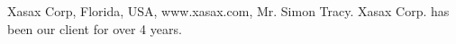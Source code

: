
Xasax Corp, Florida, USA, www.xasax.com, Mr. Simon Tracy.
Xasax Corp. has been our client for over 4 years.